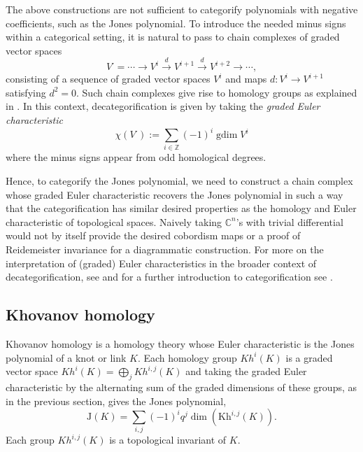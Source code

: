\documentclass[a4paper,onecolumn,unpublished]{quantumarticle}
\theoremstyle{plain}
\theoremstyle{definition}
\theoremstyle{definition}
\numberwithin{equation}{section}
\newcommand{\maps}{\colon}
\renewcommand{\to}{\rightarrow}
\begin{document}
The above constructions are not sufficient to categorify polynomials with negative coefficients, such as the Jones polynomial. To introduce the needed minus signs within a categorical setting,  it is natural to pass to chain complexes of graded vector spaces
\begin{equation}
V^{\cdot}=\cdots \longrightarrow V^i \xrightarrow{d} V^{i+1} \xrightarrow{d} V^{i+2} \longrightarrow \cdots ,
\end{equation}
consisting of a sequence of graded vector spaces $V^i$ and maps $d \maps V^i \to V^{i+1}$ satisfying $d^2=0$.   Such chain complexes give rise to homology groups as explained in .  In this context, decategorification is given by taking  the \emph{graded Euler characteristic}
\begin{equation} \label{eq:gradedEuler}
    \chi\left(V^{\cdot}\right):=\sum_{i \in \mathbb{Z}}(-1)^i \operatorname{gdim} V^i  
\end{equation}
where the minus signs appear from odd homological degrees.   

Hence, to categorify the Jones polynomial, we need to construct a chain complex whose graded Euler characteristic recovers the Jones polynomial in such a way that the categorification has similar desired properties as the homology and Euler characteristic of topological spaces.  Naively taking $\mathbb{C}^n$'s with trivial differential would not by itself provide the desired cobordism maps or a proof of Reidemeister invariance for a diagrammatic construction.     For more on the interpretation of (graded) Euler characteristics in the broader context of decategorification, see \cite{Beliakova} and for a further introduction to categorification see \cite{LaudaSussan2022}.
 
\subsection{Khovanov homology}
\label{sec:khovanov_homology_background}
 
Khovanov homology \cite{Kh1} is a homology theory whose Euler characteristic is the Jones polynomial of a knot or link $K$. Each homology group $Kh^i(K)$ is a graded vector space $Kh^i(K)=\bigoplus_{j}Kh^{i,j}(K)$ and taking the graded Euler characteristic by the alternating sum of the graded dimensions of these groups, as in the previous section, gives the Jones polynomial,
\[
\mathrm{J}(K) = \sum_{i,j} (-1)^i q^j \dim( \mathrm{Kh}^{i,j}(K) ) .
\]
Each group $Kh^{i,j}(K)$ is a topological invariant of $K$.
\end{document}
